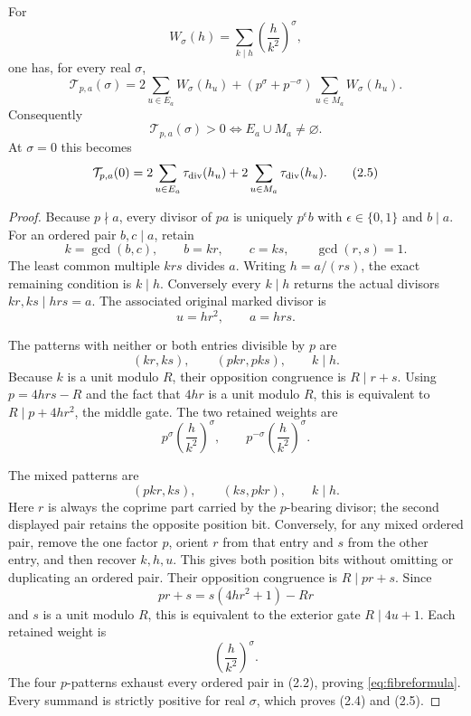 \begin{theorem}\label{thm:weighted-fibres}
For
\[
 W_\sigma(h)=\sum_{k\mid h}\left(\frac h{k^2}\right)^\sigma,
\]
one has, for every real $\sigma$,
\[
 \boxed{
 \mathcal T_{p,a}(\sigma)
 =2\sum_{u\in E_a}W_\sigma(h_u)
 +(p^\sigma+p^{-\sigma})\sum_{u\in M_a}W_\sigma(h_u).}          \tag{2.3}\label{eq:fibreformula}
\]
Consequently
\[
 \boxed{\mathcal T_{p,a}(\sigma)>0
 \Longleftrightarrow E_a\cup M_a\ne\varnothing.}               \tag{2.4}
\]
At $\sigma=0$ this becomes
\[
 \mathcal T_{p,a}(0)
 =2\sum_{u\in E_a}\tau_{\rm div}(h_u)
 +2\sum_{u\in M_a}\tau_{\rm div}(h_u).                         \tag{2.5}
\]
\end{theorem}

\begin{proof}
Because $p\nmid a$, every divisor of $pa$ is uniquely $p^\epsilon b$ with
$\epsilon\in\{0,1\}$ and $b\mid a$.  For an ordered pair $b,c\mid a$, retain
\[
 k=\gcd(b,c),\qquad b=kr,\qquad c=ks,\qquad\gcd(r,s)=1.
\]
The least common multiple $krs$ divides $a$.  Writing $h=a/(rs)$, the exact
remaining condition is $k\mid h$.  Conversely every $k\mid h$ returns the
actual divisors $kr,ks\mid hrs=a$.  The associated original marked divisor is
\[
 u=hr^2,\qquad a=hrs.                                            \tag{2.6}
\]

The patterns with neither or both entries divisible by $p$ are
\[
 (kr,ks),\qquad(pkr,pks),\qquad k\mid h.
\]
Because $k$ is a unit modulo $R$, their opposition congruence is $R\mid r+s$.
Using $p=4hrs-R$ and the fact that $4hr$ is a unit modulo $R$, this is equivalent
to $R\mid p+4hr^2$, the middle gate.  The two retained weights are
\[
 p^\sigma\left(\frac h{k^2}\right)^\sigma,\qquad
 p^{-\sigma}\left(\frac h{k^2}\right)^\sigma.                  \tag{2.7}
\]

The mixed patterns are
\[
 (pkr,ks),\qquad(ks,pkr),\qquad k\mid h.
\]
Here $r$ is always the coprime part carried by the $p$-bearing divisor; the
second displayed pair retains the opposite position bit.  Conversely, for any
mixed ordered pair, remove the one factor $p$, orient $r$ from that entry and
$s$ from the other entry, and then recover $k,h,u$.  This gives both position
bits without omitting or duplicating an ordered pair.
Their opposition congruence is $R\mid pr+s$.  Since
\[
 pr+s=s(4hr^2+1)-Rr
\]
and $s$ is a unit modulo $R$, this is equivalent to the exterior gate
$R\mid4u+1$.  Each retained weight is
\[
 \left(\frac h{k^2}\right)^\sigma.                              \tag{2.8}
\]
The four $p$-patterns exhaust every ordered pair in (2.2), proving
\eqref{eq:fibreformula}.  Every summand is strictly positive for real $\sigma$,
which proves (2.4) and (2.5).
\end{proof}

